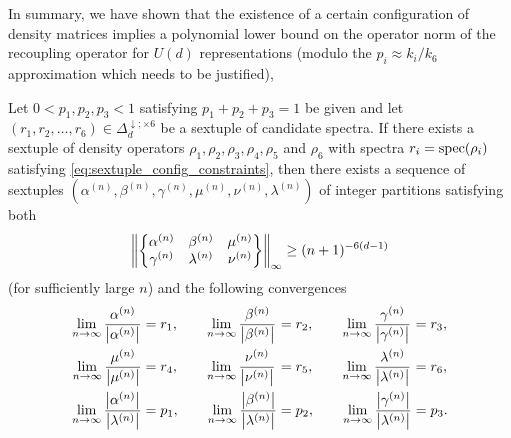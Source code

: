 \documentclass[notitlepage, 10pt]{article}
\begin{document}
In summary, we have shown that the existence of a certain configuration of density matrices implies a polynomial lower bound on the operator norm of the recoupling operator for $U(d)$ representations (modulo the $p_i \approx k_i/k_6$ approximation which needs to be justified),
\begin{thm}
    Let $0 < p_1, p_2, p_3 < 1$ satisfying $p_1 + p_2 + p_3 = 1$ be given and let $(r_1, r_2, \ldots, r_6) \in \Delta_{d}^{\downarrow; \times 6}$ be a sextuple of candidate spectra.
    If there exists a sextuple of density operators $\rho_1, \rho_2, \rho_3, \rho_4, \rho_5$ and $\rho_6$ with spectra $r_i = \operatorname{spec}(\rho_i)$ satisfying \cref{eq:sextuple_config_constraints}, then there exists a sequence of sextuples $(\alpha^{(n)}, \beta^{(n)}, \gamma^{(n)}, \mu^{(n)}, \nu^{(n)}, \lambda^{(n)})$ of integer partitions satisfying both
    \begin{equation}
        \label{eq:sequential_recoupling_norm_lower_bound_old}
        \left\lVert\begin{Bmatrix} \alpha^{(n)} & \beta^{(n)} & \mu^{(n)} \\ \gamma^{(n)} & \lambda^{(n)} & \nu^{(n)} \end{Bmatrix}\right\rVert_{\infty}
        \geq (n+1)^{-6(d-1)}
    \end{equation}
    (for sufficiently large $n$) and the following convergences
    \begin{equation}
        \label{eq:sextuple_convergence_condition}
        \begin{alignedat}{3}
            \lim_{n\to\infty} \frac{\alpha^{(n)}}{\left|\alpha^{(n)}\right|} &= r_1, \qquad
            \lim_{n\to\infty} \frac{\beta^{(n)}}{\left|\beta^{(n)}\right|} &&= r_2, \qquad
            \lim_{n\to\infty} \frac{\gamma^{(n)}}{\left|\gamma^{(n)}\right|} &&= r_3, \\
            \lim_{n\to\infty} \frac{\mu^{(n)}}{\left|\mu^{(n)}\right|} &= r_4, \qquad
            \lim_{n\to\infty} \frac{\nu^{(n)}}{\left|\nu^{(n)}\right|} &&= r_5, \qquad
            \lim_{n\to\infty} \frac{\lambda^{(n)}}{\left|\lambda^{(n)}\right|} &&= r_6, \\
            \lim_{n\to\infty} \frac{\left|\alpha^{(n)}\right|}{\left|\lambda^{(n)}\right|} &= p_1, \qquad
            \lim_{n\to\infty} \frac{\left|\beta^{(n)}\right|}{\left|\lambda^{(n)}\right|} &&= p_2, \qquad
            \lim_{n\to\infty} \frac{\left|\gamma^{(n)}\right|}{\left|\lambda^{(n)}\right|} &&= p_3.
        \end{alignedat}
    \end{equation}
\end{thm}
\end{document}
